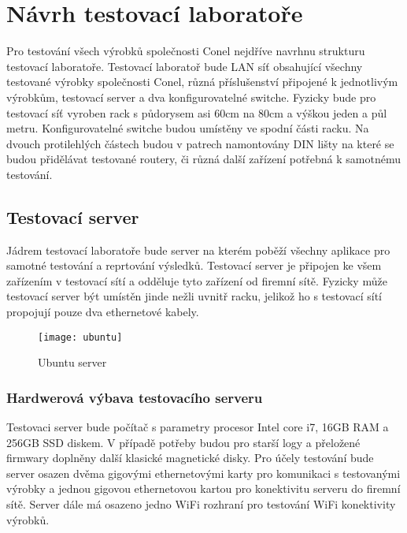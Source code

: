 \chapter{Návrh testovací laboratoře}
Pro testování všech výrobků společnosti Conel nejdříve navrhnu strukturu testovací laboratoře. Testovací laboratoř bude LAN síť obsahující všechny testované výrobky společnosti Conel, různá příslušenství připojené k jednotlivým výrobkům, testovací server a dva konfigurovatelné switche. Fyzicky bude pro testovací síť vyroben rack s půdorysem asi 60cm na 80cm a výškou jeden a půl metru. Konfigurovatelné switche budou umístěny ve spodní části racku. Na dvouch protilehlých částech budou v patrech namontovány DIN lišty na které se budou přidělávat testované routery, či různá další zařízení potřebná k samotnému testování.

\section{Testovací server}
Jádrem testovací laboratoře bude server na kterém poběží všechny aplikace pro samotné testování a reprtování výsledků. Testovací server je připojen ke všem zařízením v testovací sítí a odděluje tyto zařízení od firemní sítě. Fyzicky může testovací server být umístěn jinde nežli uvnitř racku, jelikož ho s testovací sítí propojují pouze dva ethernetové kabely.

\begin{figure}[h]
  \centering
  \texttt{[image: ubuntu]}
  \caption{Ubuntu server}
  \label{fig:ubuntu}
\end{figure}

\subsection{Hardwerová výbava testovacího serveru}
Testovaci server bude počítač s parametry procesor Intel core i7, 16GB RAM a 256GB SSD diskem. V případě potřeby budou pro starší logy a přeložené firmwary doplněny další klasické magnetické disky. Pro účely testování bude server osazen dvěma gigovými ethernetovými karty pro komunikaci s testovanými výrobky a jednou gigovou ethernetovou kartou pro konektivitu serveru do firemní sítě. Server dále má osazeno jedno WiFi rozhraní pro testování WiFi konektivity výrobků.


